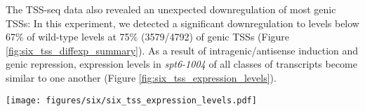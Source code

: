 The TSS-seq data also revealed an unexpected downregulation of most genic TSSs: In this experiment, we detected a significant downregulation to levels below 67\% of wild-type levels at 75\% (3579/4792) of genic TSSs (Figure \ref{fig:six_tss_diffexp_summary}).
As a result of intragenic/antisense induction and genic repression, expression levels in \textit{spt6-1004} of all classes of transcripts become similar to one another (Figure \ref{fig:six_tss_expression_levels}).
\begin{SCfigure}[50][h]
    \centering
    \texttt{[image: figures/six/six\_tss\_expression\_levels.pdf]}
    \caption[Violin plots of expression level distributions for genomic classes of TSS-seq peaks in wild-type and \textit{spt6-1004} cells.]{Violin plots of expression level distributions for genomic classes of TSS-seq peaks in wild-type and \textit{spt6-1004}, both after 80 minutes at 37\textdegree C. Normalized counts are the mean of spike-in size factor normalized counts from two replicates.}
    \label{fig:six_tss_expression_levels}
\end{SCfigure}

